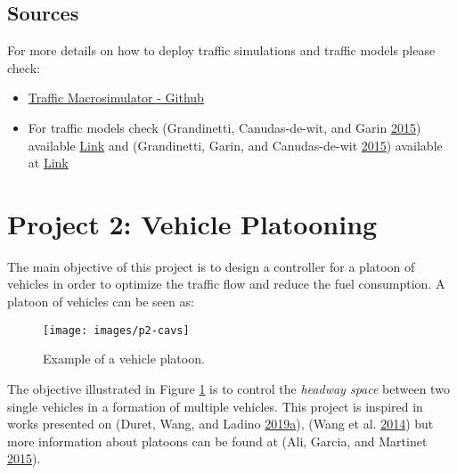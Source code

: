 \documentclass[]{book}
\theoremstyle{definition}
\theoremstyle{definition}
\theoremstyle{definition}
\theoremstyle{remark}
\begin{document}
\hypertarget{sources}{%
\section*{Sources}\label{sources}}

For more details on how to deploy traffic simulations and traffic models
please check:

\begin{itemize}
\item
  \href{https://github.com/andres-ladino-ifsttar/traffic-macrosimulator}{Traffic
  Macrosimulator - Github}
\item
  For traffic models check (Grandinetti, Canudas-de-wit, and Garin
  \protect\hyperlink{ref-Grandinetti2015}{2015}) available
  \href{https://hal.archives-ouvertes.fr/hal-01188535}{Link} and
  (Grandinetti, Garin, and Canudas-de-wit
  \protect\hyperlink{ref-Grandinetti2016}{2015}) available at
  \href{https://hal.archives-ouvertes.fr/hal-01188811}{Link}
\end{itemize}

\hypertarget{project-2-vehicle-platooning}{%
\chapter*{Project 2: Vehicle
Platooning}\label{project-2-vehicle-platooning}}

The main objective of this project is to design a controller for a
platoon of vehicles in order to optimize the traffic flow and reduce the
fuel consumption. A platoon of vehicles can be seen as:



\begin{figure}

{\centering \texttt{[image: images/p2-cavs]} 

}

\caption{Example of a vehicle platoon.}\label{fig:cav}
\end{figure}

The objective illustrated in Figure \ref{fig:cav} is to control the
\emph{headway space} between two single vehicles in a formation of
multiple vehicles. This project is inspired in works presented on
(Duret, Wang, and Ladino
\protect\hyperlink{ref-Duret2019:ISTTT}{2019}\protect\hyperlink{ref-Duret2019:ISTTT}{a}),
(Wang et al. \protect\hyperlink{ref-Meng2014b:TR-C}{2014}) but more
information about platoons can be found at (Ali, Garcia, and Martinet
\protect\hyperlink{ref-Ali2015:ITSM}{2015}).
\end{document}
